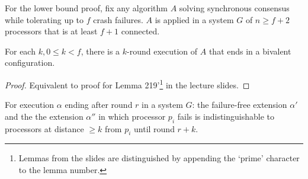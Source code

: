 For the lower bound proof, fix any algorithm $A$ solving synchronous consensus
while tolerating up to $f$ crash failures. $A$ is applied in a system $G$ of
$n \geq f+2$ processors that is at least $f+1$ connected.

\begin{lemma}
For each $k, 0 \leq k < f$, there is a $k$-round execution of $A$ that ends in
a bivalent configuration.
\end{lemma}

\begin{proof}
Equivalent to proof for Lemma 219'\footnote{Lemmas from the slides are
distinguished by appending the `prime' character to the lemma number.} 
in the lecture slides.
\end{proof}

\begin{lemma} \label{lemma:indist_dist}
For execution $\alpha$ ending after round $r$ in a system $G$: the failure-free
extension $\alpha'$ and the the extension $\alpha''$ in which
processor $p_i$ fails is indistinguishable to processors at distance $\geq k$ from
$p_i$ until round $r+k$.
\end{lemma}

